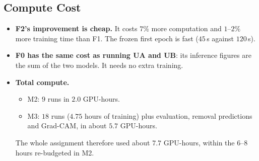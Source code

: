 \subsection{Compute Cost}
\label{sec:cost}

\begin{table}[H]
  \centering\small
  \caption{Compute cost on the RTX A6000 (shared). Inference uses bf16, $224$\,px images and titles trimmed per
  batch. T0 runs on the CPU.}
  \label{tab:cost}
\end{table}

\begin{itemize}
  \item \textbf{F2's improvement is cheap.} It costs $7\%$ more computation and $1$--$2\%$ more training time than F1.
        The frozen first epoch is fast ($45$\,s against $120$\,s).
  \item \textbf{F0 has the same cost as running UA and UB}: its inference figures are the sum of the two models.
        It needs no extra training.
  \item \textbf{Total compute.}
        \begin{itemize}
          \item M2: $9$ runs in $2.0$ GPU-hours.
          \item M3: $18$ runs ($4.75$ hours of training) plus evaluation, removal predictions and Grad-CAM, in
                about $5.7$ GPU-hours.
        \end{itemize}
        The whole assignment therefore used about $7.7$ GPU-hours, within the $6$--$8$ hours re-budgeted in M2.
\end{itemize}

